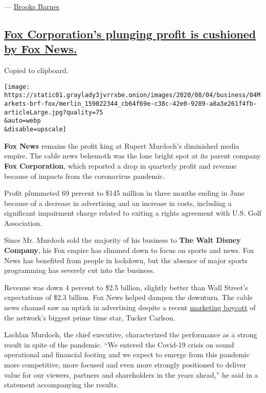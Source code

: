 --- \href{https://www.nytimes3xbfgragh.onion/by/brooks-barnes}{Brooks
Barnes}

\hypertarget{fox-corporations-plunging-profit-is-cushioned-by-fox-news}{%
\subsection{\texorpdfstring{\protect\hyperlink{fox-corporations-plunging-profit-is-cushioned-by-fox-news}{Fox
Corporation's plunging profit is cushioned by Fox
News.}}{Fox Corporation's plunging profit is cushioned by Fox News.}}\label{fox-corporations-plunging-profit-is-cushioned-by-fox-news}}

Copied to clipboard.

\texttt{[image: https://static01.graylady3jvrrxbe.onion/images/2020/08/04/business/04Markets-brf-fox/merlin\_159022344\_cb64f69e-c38c-42e0-9289-a8a3e261f4fb-articleLarge.jpg?quality=75\\\&auto=webp\\\&disable=upscale]}

\textbf{Fox News} remains the profit king at Rupert Murdoch's diminished
media empire. The cable news behemoth was the lone bright spot at its
parent company \textbf{Fox Corporation}, which reported a drop in
quarterly profit and revenue because of impacts from the coronavirus
pandemic.

Profit plummeted 69 percent to \$145 million in three months ending in
June because of a decrease in advertising and an increase in costs,
including a significant impairment charge related to exiting a rights
agreement with U.S. Golf Association.

Since Mr. Murdoch sold the majority of his business to \textbf{The Walt
Disney Company}, his Fox empire has slimmed down to focus on sports and
news. Fox News has benefited from people in lockdown, but the absence of
major sports programming has severely cut into the business.

Revenue was down 4 percent to \$2.5 billion, slightly better than Wall
Street's expectations of \$2.3 billion. Fox News helped dampen the
downturn. The cable news channel saw an uptick in advertising despite a
recent
\href{https://www.nytimes3xbfgragh.onion/2020/06/18/business/media/tucker-carlson-advertisers-ratings.html}{marketing
boycott} of the network's biggest prime time star, Tucker Carlson.

Lachlan Murdoch, the chief executive, characterized the performance as a
strong result in spite of the pandemic. ``We entered the Covid-19 crisis
on sound operational and financial footing and we expect to emerge from
this pandemic more competitive, more focused and even more strongly
positioned to deliver value for our viewers, partners and shareholders
in the years ahead,'' he said in a statement accompanying the results.

